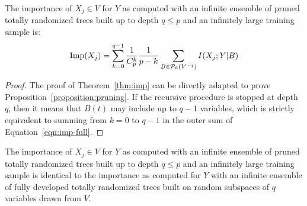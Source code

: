\begin{proposition}\label{proposition:pruning}
  The importance of $X_j \in V$ for $Y$ as computed with an
  infinite ensemble of pruned totally randomized trees built up to depth $q \leq p$ and an
infinitely large training sample is:
  \begin{equation}\label{eqn:imp-pruning}
  \text{Imp}(X_j)=\sum_{k=0}^{q-1} \frac{1}{C_p^k} \frac{1}{p-k} \sum_{B \in {\cal P}_k(V^{-j})} I(X_j;Y|B)
  \end{equation}
\end{proposition}

\begin{proof}
The proof of Theorem~\ref{thm:imp} can be directly adapted to prove
Proposition~\ref{proposition:pruning}. If the recursive procedure is stopped at
depth $q$, then it means that $B(t)$ may include up to $q-1$ variables, which is
strictly equivalent to summing from $k=0$ to $q-1$ in the outer sum of
Equation~\ref{eqn:imp-full}.
\end{proof}

\begin{proposition}\label{proposition:imp-subspaces}
  The importance of $X_j \in V$ for $Y$ as computed with an infinite ensemble   of
pruned totally randomized trees built up to depth $q \leq p$ and an infinitely
large training sample is identical to the importance as computed  for $Y$ with an
infinite ensemble of fully developed totally randomized trees built on random
subspaces of $q$ variables drawn from $V$.
\end{proposition}

